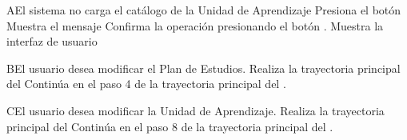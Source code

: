 
\begin{comment}
\begin{UCtrayectoriaA}{A}{El sistema no encuentra ningún formulario para mostrar.}
	\UCpaso No encuentra ningún formulario para mostrar.
    \UCpaso El sistema muestra el mensaje \MSGref{MSG6}{Por el momento no se puede registrar la bibliografía}.
    \UCpaso[\UCactor] Cierra el mensaje presionando el botón \IUbutton{Aceptar}.
    \UCpaso Continua en el paso 1 de la trayectoria principal del \UCref{CU1}.
\end{UCtrayectoriaA}
\end{comment}


\begin{UCtrayectoriaA}{A}{El sistema no carga el catálogo de la Unidad de Aprendizaje}
	\UCpaso[\UCactor] Presiona el botón 
	\UCpaso Muestra el mensaje 
	\UCpaso[\UCactor] Confirma la operación presionando el botón .
	 \UCpaso Muestra la interfaz de usuario 

\end{UCtrayectoriaA}


\begin{UCtrayectoriaA}{B}{El usuario desea modificar el Plan de Estudios.}
	\UCpaso Realiza la trayectoria principal del 
	\UCpaso Continúa en el paso 4 de la trayectoria principal del .
\end{UCtrayectoriaA}




\begin{UCtrayectoriaA}{C}{El usuario desea modificar la Unidad de Aprendizaje.}
	\UCpaso Realiza la trayectoria principal del 
	\UCpaso Continúa en el paso 8 de la trayectoria principal del .
\end{UCtrayectoriaA}


